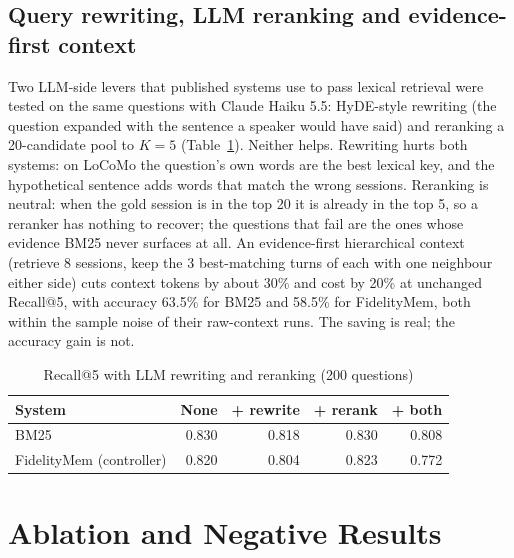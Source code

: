 \documentclass[journal]{IEEEtran}
\begin{document}
\subsection{Query rewriting, LLM reranking and evidence-first context}
Two LLM-side levers that published systems use to pass lexical retrieval were tested on the same questions with Claude Haiku 5.5: HyDE-style rewriting (the question expanded with the sentence a speaker would have said) and reranking a 20-candidate pool to $K=5$ (Table~\ref{tab:rerank}). Neither helps. Rewriting hurts both systems: on LoCoMo the question's own words are the best lexical key, and the hypothetical sentence adds words that match the wrong sessions. Reranking is neutral: when the gold session is in the top 20 it is already in the top 5, so a reranker has nothing to recover; the questions that fail are the ones whose evidence BM25 never surfaces at all. An evidence-first hierarchical context (retrieve 8 sessions, keep the 3 best-matching turns of each with one neighbour either side) cuts context tokens by about 30\% and cost by 20\% at unchanged Recall@5, with accuracy 63.5\% for BM25 and 58.5\% for FidelityMem, both within the sample noise of their raw-context runs. The saving is real; the accuracy gain is not.

\begin{table}[t]
\caption{Recall@5 with LLM rewriting and reranking (200 questions)}
\label{tab:rerank}
\centering
\scriptsize
\begin{tabular}{lrrrr}
\toprule
System & None & + rewrite & + rerank & + both \\
\midrule
BM25 & 0.830 & 0.818 & 0.830 & 0.808 \\
FidelityMem (controller) & 0.820 & 0.804 & 0.823 & 0.772 \\
\bottomrule
\end{tabular}
\end{table}

\section{Ablation and Negative Results}
\end{document}
